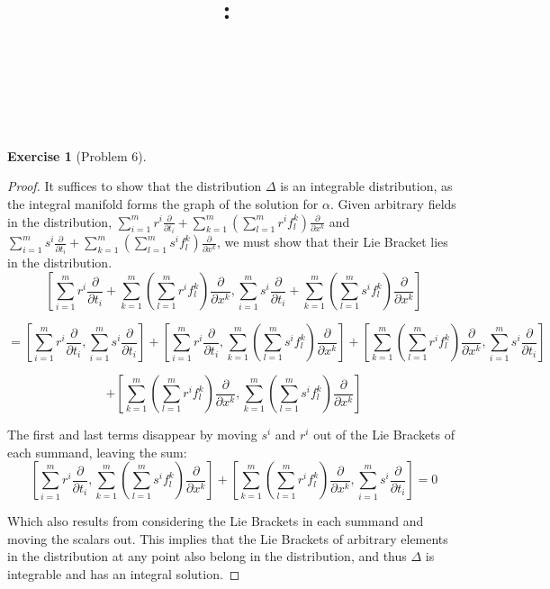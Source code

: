 \documentclass{article}
\title{
    \vspace{2in}
    \textmd{\textbf{\hmwkClass:\ \hmwkTitle}}\\
    \vspace{0.1in}
    \textmd{\hmwkDueDate} \\
    \vspace{0.2in}\large{\textit{\hmwkClassInstructor\  }}
    \vspace{2in}
}
\author{\hmwkAuthorName}
\date{}
\newtheorem{exercise}{Exercise}
\begin{document}
\maketitle

\newpage

\begin{exercise}[Problem 6]
\end{exercise}

\begin{proof}
  It suffices to show that the distribution $\Delta$ is an integrable distribution, as the integral manifold forms the graph of the solution for $\alpha$. Given arbitrary fields in the distribution, $\sum_{i=1}^{m}r^{i}\frac{\partial}{\partial t_{i}} + \sum_{k=1}^{m}(\sum_{l=1}^{m}r^{i}f^{k}_{l})\frac{\partial}{\partial x^{k}}$ and $\sum_{i=1}^{m}s^{i}\frac{\partial}{\partial t_{i}} + \sum_{k=1}^{m}(\sum_{l=1}^{m}s^{i}f^{k}_{l})\frac{\partial}{\partial x^{k}}$, we must show that their Lie Bracket lies in the distribution.
  \[
    \left[ \sum_{i=1}^{m}r^{i}\frac{\partial}{\partial t_{i}} + \sum_{k=1}^{m}(\sum_{l=1}^{m}r^{i}f^{k}_{l})\frac{\partial}{\partial x^{k}}, \sum_{i=1}^{m}s^{i}\frac{\partial}{\partial t_{i}} + \sum_{k=1}^{m}(\sum_{l=1}^{m}s^{i}f^{k}_{l})\frac{\partial}{\partial x^{k}} \right] \]

  \[ = \left[ \sum_{i=1}^{m}r^{i}\frac{\partial}{\partial t_{i}}, \sum_{i=1}^{m}s^{i}\frac{\partial}{\partial t_{i}} \right] + \left[ \sum_{i=1}^{m}r^{i}\frac{\partial}{\partial t_{i}}, \sum_{k=1}^{m}(\sum_{l=1}^{m}s^{i}f^{k}_{l})\frac{\partial}{\partial x^{k}} \right] + \left[\sum_{k=1}^{m}(\sum_{l=1}^{m}r^{i}f^{k}_{l})\frac{\partial}{\partial x^{k}}, \sum_{i=1}^{m}s^{i}\frac{\partial}{\partial t_{i}} \right]     
  \]

  \[
    + \left[\sum_{k=1}^{m}(\sum_{l=1}^{m}r^{i}f^{k}_{l})\frac{\partial}{\partial x^{k}}, \sum_{k=1}^{m}(\sum_{l=1}^{m}s^{i}f^{k}_{l})\frac{\partial}{\partial x^{k}} \right]
  \]

  The first and last terms disappear by moving $s^{i}$ and $r^{i}$ out of the Lie Brackets of each summand, leaving the sum:
  \[
    \left[ \sum_{i=1}^{m}r^{i}\frac{\partial}{\partial t_{i}}, \sum_{k=1}^{m}(\sum_{l=1}^{m}s^{i}f^{k}_{l})\frac{\partial}{\partial x^{k}} \right] + \left[\sum_{k=1}^{m}(\sum_{l=1}^{m}r^{i}f^{k}_{l})\frac{\partial}{\partial x^{k}}, \sum_{i=1}^{m}s^{i}\frac{\partial}{\partial t_{i}} \right] = 0
  \]

  Which also results from considering the Lie Brackets in each summand and moving the scalars out. This implies that the Lie Brackets of arbitrary elements in the distribution at any point also belong in the distribution, and thus $\Delta$ is integrable and has an integral solution.  
\end{proof}
\end{document}
